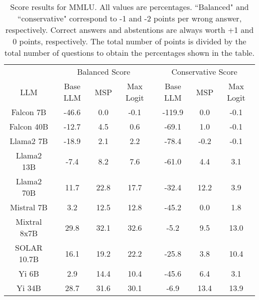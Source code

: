 \begin{table*}
\centering
\begin{tabular}{c|c|c|c|c|c|c}
& \multicolumn{3}{c|}{Balanced Score} & \multicolumn{3}{c}{Conservative Score} \\ 
LLM & Base LLM & MSP & Max Logit & Base LLM & MSP & Max Logit\\ \hline
Falcon 7B & -46.6 & 0.0 & -0.1 & -119.9 & 0.0 & -0.1\\
Falcon 40B & -12.7 & 4.5 & 0.6 & -69.1 & 1.0 & -0.1\\
Llama2 7B & -18.9 & 2.1 & 2.2 & -78.4 & -0.2 & -0.1\\
Llama2 13B & -7.4 & 8.2 & 7.6 & -61.0 & 4.4 & 3.1\\
Llama2 70B & 11.7 & 22.8 & 17.7 & -32.4 & 12.2 & 3.9\\
Mistral 7B & 3.2 & 12.5 & 12.8 & -45.2 & 0.0 & 1.8\\
Mixtral 8x7B & 29.8 & 32.1 & 32.6 & -5.2 & 9.5 & 13.0\\
SOLAR 10.7B & 16.1 & 19.2 & 22.2 & -25.8 & 3.8 & 10.4\\
Yi 6B & 2.9 & 14.4 & 10.4 & -45.6 & 6.4 & 3.1\\
Yi 34B & 28.7 & 31.6 & 30.1 & -6.9 & 13.4 & 13.9\\
\hline
\end{tabular}
\caption{Score results for MMLU. All values are percentages. ``Balanced" and ``conservative" correspond to -1 and -2 points per wrong answer, respectively. Correct answers and abstentions are always worth +1 and 0 points, respectively. The total number of points is divided by the total number of questions to obtain the percentages shown in the table.}
\label{tab:mmlu_score}
\end{table*}
